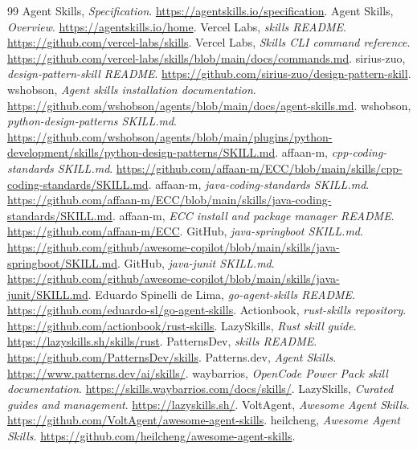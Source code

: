 \documentclass[11pt,letterpaper]{article}
\begin{document}
\begin{thebibliography}{99}\setlength{\itemsep}{3pt}
 Agent Skills, \emph{Specification}. \url{https://agentskills.io/specification}.
 Agent Skills, \emph{Overview}. \url{https://agentskills.io/home}.
 Vercel Labs, \emph{skills README}. \url{https://github.com/vercel-labs/skills}.
 Vercel Labs, \emph{Skills CLI command reference}. \url{https://github.com/vercel-labs/skills/blob/main/docs/commands.md}.
 sirius-zuo, \emph{design-pattern-skill README}. \url{https://github.com/sirius-zuo/design-pattern-skill}.
 wshobson, \emph{Agent skills installation documentation}. \url{https://github.com/wshobson/agents/blob/main/docs/agent-skills.md}.
 wshobson, \emph{python-design-patterns SKILL.md}. \url{https://github.com/wshobson/agents/blob/main/plugins/python-development/skills/python-design-patterns/SKILL.md}.
 affaan-m, \emph{cpp-coding-standards SKILL.md}. \url{https://github.com/affaan-m/ECC/blob/main/skills/cpp-coding-standards/SKILL.md}.
 affaan-m, \emph{java-coding-standards SKILL.md}. \url{https://github.com/affaan-m/ECC/blob/main/skills/java-coding-standards/SKILL.md}.
 affaan-m, \emph{ECC install and package manager README}. \url{https://github.com/affaan-m/ECC}.
 GitHub, \emph{java-springboot SKILL.md}. \url{https://github.com/github/awesome-copilot/blob/main/skills/java-springboot/SKILL.md}.
 GitHub, \emph{java-junit SKILL.md}. \url{https://github.com/github/awesome-copilot/blob/main/skills/java-junit/SKILL.md}.
 Eduardo Spinelli de Lima, \emph{go-agent-skills README}. \url{https://github.com/eduardo-sl/go-agent-skills}.
 Actionbook, \emph{rust-skills repository}. \url{https://github.com/actionbook/rust-skills}.
 LazySkills, \emph{Rust skill guide}. \url{https://lazyskills.sh/skills/rust}.
 PatternsDev, \emph{skills README}. \url{https://github.com/PatternsDev/skills}.
 Patterns.dev, \emph{Agent Skills}. \url{https://www.patterns.dev/ai/skills/}.
 waybarrios, \emph{OpenCode Power Pack skill documentation}. \url{https://skills.waybarrios.com/docs/skills/}.
 LazySkills, \emph{Curated guides and management}. \url{https://lazyskills.sh/}.
 VoltAgent, \emph{Awesome Agent Skills}. \url{https://github.com/VoltAgent/awesome-agent-skills}.
 heilcheng, \emph{Awesome Agent Skills}. \url{https://github.com/heilcheng/awesome-agent-skills}.

\end{thebibliography}
\end{document}
